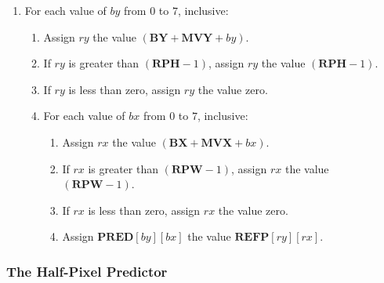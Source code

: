 \documentclass[9pt,letterpaper]{book}
\newcommand{\idx}[1]{{\ensuremath{\mathit{#1}}}}
\newcommand{\bitvar}[1]{\ensuremath{\mathbf{\bm{#1}}}}
\newcommand{\locvar}[1]{\ensuremath{\mathrm{#1}}}
\numberwithin{equation}{chapter}
\numberwithin{figure}{chapter}
\numberwithin{table}{chapter}
\begin{document}
\begin{enumerate}
\item
For each value of \locvar{\idx{by}} from $0$ to $7$, inclusive:
\begin{enumerate}
\item
Assign \locvar{\idx{ry}} the value
 $(\bitvar{BY}+\bitvar{MVY}+\locvar{\idx{by}})$.
\item
If \locvar{\idx{ry}} is greater than $(\bitvar{RPH}-1)$, assign
 \locvar{\idx{ry}} the value $(\bitvar{RPH}-1)$.
\item
If \locvar{\idx{ry}} is less than zero, assign \locvar{\idx{ry}} the value
 zero.
\item
For each value of \locvar{\idx{bx}} from $0$ to $7$, inclusive:
\begin{enumerate}
\item
Assign \locvar{\idx{rx}} the value
 $(\bitvar{BX}+\bitvar{MVX}+\locvar{\idx{bx}})$.
\item
If \locvar{\idx{rx}} is greater than $(\bitvar{RPW}-1)$, assign
 \locvar{\idx{rx}} the value $(\bitvar{RPW}-1)$.
\item
If \locvar{\idx{rx}} is less than zero, assign \locvar{\idx{rx}} the value
 zero.
\item
Assign $\bitvar{PRED}[\locvar{\idx{by}}][\locvar{\idx{bx}}]$ the value
 $\bitvar{REFP}[\locvar{\idx{ry}}][\locvar{\idx{rx}}]$.
\end{enumerate}
\end{enumerate}
\end{enumerate}

\subsubsection{The Half-Pixel Predictor}
\label{sub:predhalfpel}
\end{document}
